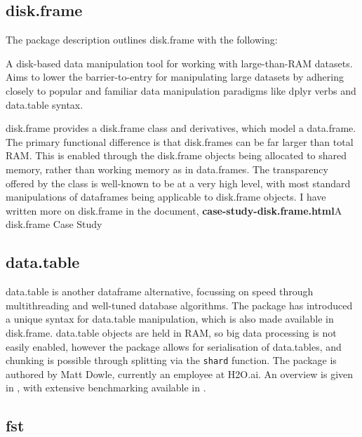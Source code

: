 \hypertarget{sec:disk.frame}{%
    \subsection{disk.frame}\label{sec:disk.frame}}

The package description outlines disk.frame with the following:

\begin{displayquote}
    A disk-based data manipulation tool for working with large-than-RAM
    datasets. Aims to lower the barrier-to-entry for manipulating large
    datasets by adhering closely to popular and familiar data manipulation
    paradigms like dplyr verbs and data.table syntax.
\end{displayquote}

disk.frame provides a disk.frame class and derivatives, which model a
data.frame. The primary functional difference is that disk.frames can be
far larger than total RAM. This is enabled through the disk.frame
objects being allocated to shared memory, rather than working memory as
in data.frames. The transparency offered by the class is well-known to
be at a very high level, with most standard manipulations of dataframes
being applicable to disk.frame objects. I have written more on
disk.frame in the document, \textbf{case-study-disk.frame.html}{A
    disk.frame Case Study}

\hypertarget{sec:data.table}{%
    \subsection{data.table}\label{sec:data.table}}

data.table is another dataframe alternative, focussing on speed through
multithreading and well-tuned database algorithms\cite{dowle19}. The
package has introduced a unique syntax for data.table manipulation,
which is also made available in disk.frame. data.table objects are held
in RAM, so big data processing is not easily enabled, however the
package allows for serialisation of data.tables, and chunking is
possible through splitting via the \texttt{shard} function. The package
is authored by Matt Dowle, currently an employee at H2O.ai. An overview
is given in \cite{dowle19:_introd}, with extensive benchmarking
available in \cite{dowle19:_bench}.

\hypertarget{sec:fst}{%
    \subsection{fst}\label{sec:fst}}


